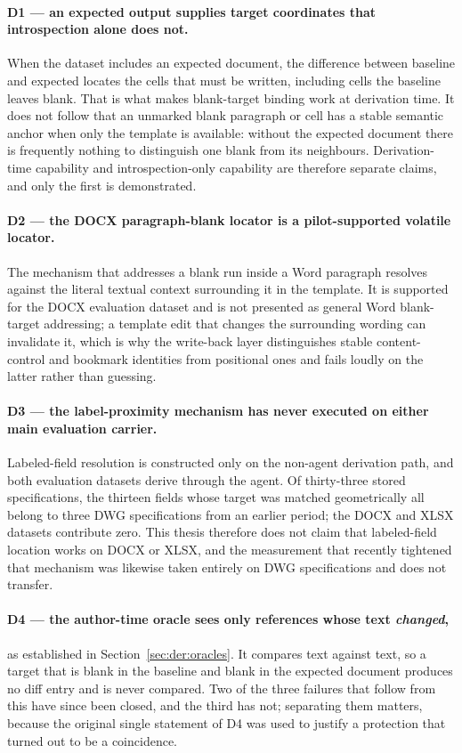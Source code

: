 \paragraph{D1 --- an expected output supplies target coordinates that introspection alone does not.}
When the dataset includes an expected document, the difference between baseline and expected locates the
cells that must be written, including cells the baseline leaves blank. That is what makes blank-target binding
work at derivation time. It does not follow that an unmarked blank paragraph or cell has a stable semantic
anchor when only the template is available: without the expected document there is frequently nothing to
distinguish one blank from its neighbours. Derivation-time capability and introspection-only capability are
therefore separate claims, and only the first is demonstrated.

\paragraph{D2 --- the DOCX paragraph-blank locator is a pilot-supported volatile locator.}
The mechanism that addresses a blank run inside a Word paragraph resolves against the literal textual context
surrounding it in the template. It is supported for the DOCX evaluation dataset and is not presented as general
Word blank-target addressing; a template edit that changes the surrounding wording can invalidate it, which is
why the write-back layer distinguishes stable content-control and bookmark identities from positional ones and
fails loudly on the latter rather than guessing.

\paragraph{D3 --- the label-proximity mechanism has never executed on either main evaluation carrier.}
Labeled-field resolution is constructed only on the non-agent derivation path, and both evaluation datasets
derive through the agent. Of thirty-three stored specifications, the thirteen fields whose target was matched
geometrically all belong to three DWG specifications from an earlier period; the DOCX and XLSX datasets
contribute zero. This thesis therefore does not claim that labeled-field location works on DOCX or XLSX, and the
measurement that recently tightened that mechanism was likewise taken entirely on DWG specifications and does
not transfer.

\paragraph{D4 --- the author-time oracle sees only references whose text \emph{changed},}
as established in Section~\ref{sec:der:oracles}. It compares text against text, so a target
that is blank in the baseline and blank in the expected document produces no diff entry and
is never compared. Two of the three failures that follow from this have since been closed, and
the third has not; separating them matters, because the original single statement of D4 was
used to justify a protection that turned out to be a coincidence.

